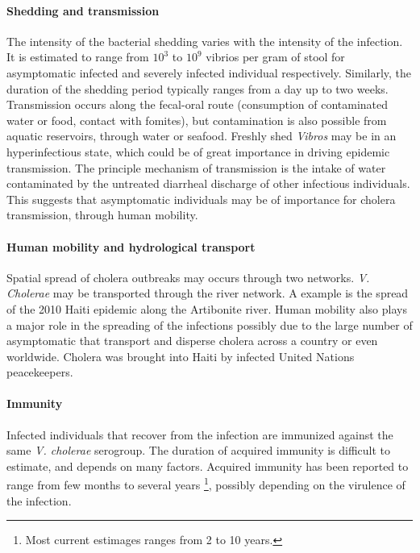 \paragraph{Shedding and transmission} The intensity of the bacterial shedding varies with the intensity of the infection. It is estimated to range from $10^3$ to $10^{9}$ vibrios per gram of stool for asymptomatic infected and severely infected individual respectively\cite{Nelson:CholeraTransmissionHost:2009}. Similarly, the duration of the shedding period typically ranges from a day up to two weeks\cite{Nelson:CholeraTransmissionHost:2009, Kaper:Cholera:1995}.
Transmission occurs along the fecal-oral route (consumption of contaminated water or food, contact with fomites), but contamination is also possible from aquatic reservoirs, through water or seafood. Freshly shed \textit{Vibros} may be in an hyperinfectious state, which could be of great importance in driving epidemic transmission\cite{Butler:CholeraStoolBacteria:2006}. The principle mechanism of transmission is the intake of water contaminated by the untreated diarrheal discharge of other infectious individuals.
This suggests that asymptomatic individuals may be of importance for cholera transmission, through human mobility.

\paragraph{Human mobility and hydrological transport} Spatial spread of cholera outbreaks may occurs through two networks. \textit{V. Cholerae} may be transported through the river network. A example is the spread of the 2010 Haiti epidemic along the Artibonite river\cite{Piarroux:UnderstandingCholeraEpidemic:2011}. Human mobility also plays a major role in the spreading of the infections possibly due to the large number of asymptomatic that transport and disperse cholera across a country or even worldwide.  Cholera was brought into Haiti by infected United Nations peacekeepers\cite{Piarroux:UnderstandingCholeraEpidemic:2011}. %

\paragraph{Immunity} Infected individuals that recover from the infection are immunized against the same \textit{V. cholerae} serogroup. The duration of acquired immunity is difficult to estimate, and depends on many factors. Acquired immunity has been reported to range from few months to several years \footnote{Most current estimages ranges from 2 to 10 years.}, possibly depending on the virulence of the infection\cite{Levine:DurationInfectionDerivedImmunity:1981,Kaper:Cholera:1995,Woodward:CholeraReinfectionMan:1971,Glass:SeroepidemiologicalStudiesEI:1985,Clemens:BiotypeDeterminantNatural:1991,Leung:ProtectionAffordedPrevious:2021}.

